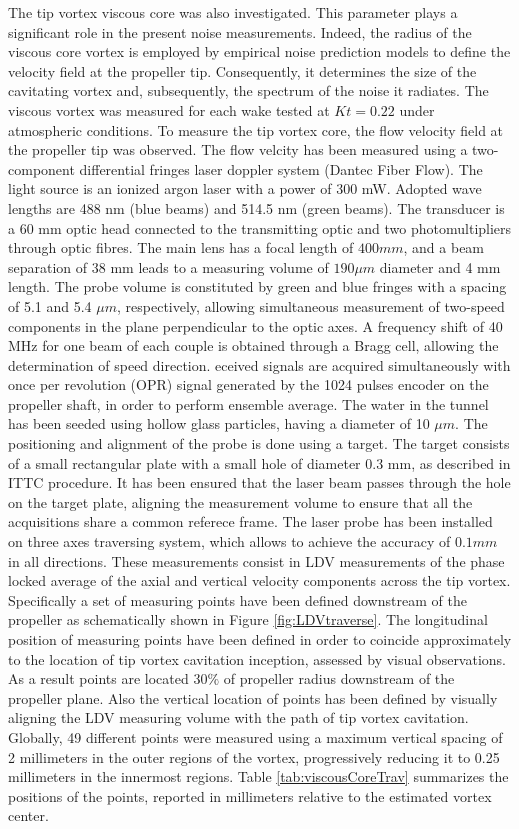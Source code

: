 The tip vortex viscous core was also investigated. This parameter plays a significant role in the present noise measurements. Indeed, the radius of the viscous core vortex is employed by empirical noise prediction models to define the velocity field at the propeller tip. Consequently, it determines the size of the cavitating vortex and, subsequently, the spectrum of the noise it radiates.
The viscous vortex was measured for each wake tested at $Kt = 0.22$ under atmospheric conditions.
To measure the tip vortex core, the flow velocity field at the propeller tip was observed.
The flow velcity has been measured using a two-component differential fringes laser doppler system (Dantec Fiber Flow). The light source is an ionized argon laser with a power of 300 mW. Adopted wave lengths are 488 nm (blue beams) and 514.5 nm (green beams). The transducer is a 60 mm optic head connected to the transmitting optic and two photomultipliers through optic fibres. The main lens has a focal length of $400 mm$, and a beam separation of 38 mm leads to a measuring volume of $190 \mu m$ diameter and 4 mm length. The probe volume is constituted by green and blue fringes with a spacing of 5.1 and 5.4 $\mu m$, respectively, allowing simultaneous measurement of two-speed components in the plane perpendicular to the optic axes. A frequency shift of 40 MHz for one beam of each couple is obtained through a Bragg cell, allowing the determination of speed direction. eceived signals are acquired simultaneously with once per revolution (OPR) signal generated by the 1024 pulses encoder on the propeller shaft, in order to perform ensemble average. The water in the tunnel has been seeded using hollow glass particles, having a diameter of 10 $\mu m$.
The positioning and alignment of the probe is done using a target. The target consists of a small rectangular plate with a small hole of diameter 0.3 mm, as described in ITTC procedure. It has been ensured that the laser beam passes through the hole on the target plate, aligning the measurement volume to ensure that all the acquisitions share a common referece frame. 
The laser probe has been installed on three axes traversing system, which allows to achieve the accuracy of $0.1 mm$ in all directions. 
These measurements consist in LDV measurements of the phase locked average of the axial and vertical velocity components across the tip vortex. Specifically a set of measuring points have been defined downstream of the propeller as schematically shown in Figure \ref{fig:LDVtraverse}. 
The longitudinal position of measuring points have been defined in order to coincide approximately to the location of tip vortex cavitation inception, assessed by visual observations. As a result points are located $30\%$ of propeller radius downstream of the propeller plane. Also the vertical location of points has been defined by visually aligning the LDV measuring volume with the path of tip vortex cavitation. 
Globally, 49 different points were measured using a maximum vertical spacing of 2 millimeters in the outer regions of the vortex, progressively reducing it to 0.25 millimeters in the innermost regions. Table \ref{tab:viscousCoreTrav} summarizes the positions of the points, reported in millimeters relative to the estimated vortex center.

